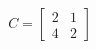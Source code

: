 \documentclass[preview]{standalone}
\begin{document}
\begin{align*}
C = \begin{bmatrix} 2 & 1 \\ 4 & 2 \end{bmatrix}
\end{align*}
\end{document}
